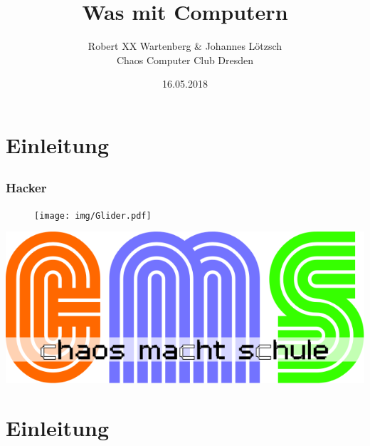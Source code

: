 \documentclass[12pt]{beamer}
\title{Was mit Computern}
\author{\small Robert XX Wartenberg \& Johannes Lötzsch\\\large Chaos Computer Club Dresden}
\date{16.05.2018}
\begin{document}
\maketitle

\section{Einleitung}
\subsection{}

\begin{frame}
  \frametitle{Hacker}
  \begin{figure}
    \texttt{[image: img/Glider.pdf]}
  \end{figure}
\end{frame}

\begin{frame}
	\begin{center}
    	\includegraphics[height=0.5\textheight]{img/cms-text.png}
    \end{center}
\end{frame}

\section{Einleitung}
	\subsection{}
\end{document}
